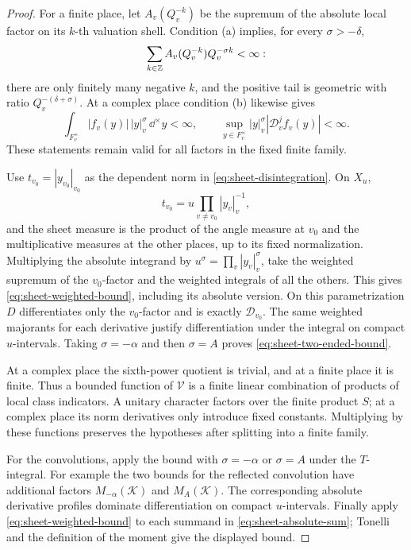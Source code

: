\begin{proof}
For a finite place, let \(A_v(Q_v^{-k})\) be the supremum of the
absolute local factor on its \(k\)-th valuation shell.  Condition
(a) implies, for every \(\sigma>-\delta\),
\[
 \sum_{k\in\mathbb{Z}} A_v(Q_v^{-k})Q_v^{-\sigma k}<\infty:
\]
there are only finitely many negative \(k\), and the positive tail
is geometric with ratio \(Q_v^{-(\delta+\sigma)}\).
At a complex place condition (b) likewise gives
\[
 \int_{F_v^\times}|f_v(y)|\,|y|_v^\sigma\,\dd^\times y<\infty,
 \qquad
 \sup_{y\in F_v^\times}|y|_v^\sigma
                     |\mathcal D_v^j f_v(y)|<\infty.
\]
These statements remain valid for all factors in the fixed finite
family.

Use \(t_{v_0}=|y_{v_0}|_{v_0}\) as the dependent norm in
\eqref{eq:sheet-disintegration}.  On \(X_u\),
\[
 t_{v_0}=u\prod_{v\ne v_0}|y_v|_v^{-1},
\]
and the sheet measure is the product of the angle measure at \(v_0\)
and the multiplicative measures at the other places, up to its fixed
normalization.  Multiplying the absolute integrand by
\(u^\sigma=\prod_v|y_v|_v^\sigma\), take the weighted supremum of the
\(v_0\)-factor and the weighted integrals of all the others.  This
gives \eqref{eq:sheet-weighted-bound}, including its absolute
version.  On this parametrization \(D\) differentiates only the
\(v_0\)-factor and is exactly \(\mathcal D_{v_0}\).
The same weighted majorants for each derivative justify
differentiation under the integral on compact \(u\)-intervals.
Taking \(\sigma=-\alpha\) and then \(\sigma=A\) proves
\eqref{eq:sheet-two-ended-bound}.

At a complex place the sixth-power quotient is trivial, and at a
finite place it is finite.  Thus a bounded function of
\(\mathcal V\) is a finite linear combination of products of local
class indicators.  A unitary character factors over the finite
product \(S\); at a complex place its norm derivatives only introduce
fixed constants.  Multiplying by these functions preserves the
hypotheses after splitting into a finite family.

For the convolutions, apply the bound with \(\sigma=-\alpha\) or
\(\sigma=A\) under the \(T\)-integral.  For example the two bounds
for the reflected convolution have additional factors
\(M_{-\alpha}(\mathcal K)\) and \(M_A(\mathcal K)\).
The corresponding absolute derivative profiles dominate
differentiation on compact \(u\)-intervals.  Finally apply
\eqref{eq:sheet-weighted-bound} to each summand in
\eqref{eq:sheet-absolute-sum}; Tonelli and the definition of the
moment give the displayed bound.
\end{proof}

